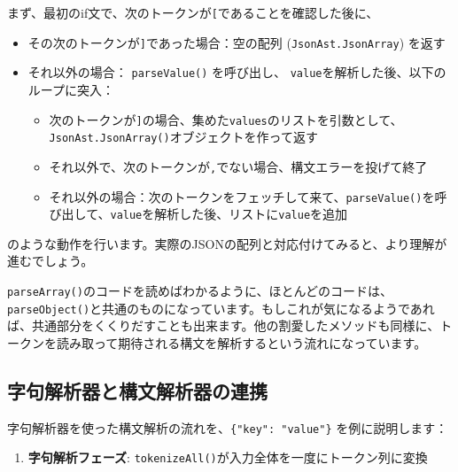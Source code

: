 まず、最初のif文で、次のトークンが\texttt{{[}}であることを確認した後に、

\begin{itemize}
\tightlist
\item
  その次のトークンが\texttt{{]}}であった場合：空の配列
  (\texttt{JsonAst.JsonArray}) を返す
\item
  それ以外の場合： \texttt{parseValue()} を呼び出し、
  \texttt{value}を解析した後、以下のループに突入：

  \begin{itemize}
  \tightlist
  \item
    次のトークンが\texttt{{]}}の場合、集めた\texttt{values}のリストを引数として、\texttt{JsonAst.JsonArray()}オブジェクトを作って返す
  \item
    それ以外で、次のトークンが\texttt{,}でない場合、構文エラーを投げて終了
  \item
    それ以外の場合：次のトークンをフェッチして来て、\texttt{parseValue()}を呼び出して、\texttt{value}を解析した後、リストに\texttt{value}を追加
  \end{itemize}
\end{itemize}

のような動作を行います。実際のJSONの配列と対応付けてみると、より理解が進むでしょう。

\texttt{parseArray()}のコードを読めばわかるように、ほとんどのコードは、\texttt{parseObject()}と共通のものになっています。もしこれが気になるようであれば、共通部分をくくりだすことも出来ます。他の割愛したメソッドも同様に、トークンを読み取って期待される構文を解析するという流れになっています。

\hypertarget{chapter3-ux5b57ux53e5ux89e3ux6790ux5668ux3068ux69cbux6587ux89e3ux6790ux5668ux306eux9023ux643a}{%
\subsection{字句解析器と構文解析器の連携}\label{chapter3-ux5b57ux53e5ux89e3ux6790ux5668ux3068ux69cbux6587ux89e3ux6790ux5668ux306eux9023ux643a}}

字句解析器を使った構文解析の流れを、\texttt{\{"key":\ "value"\}}
を例に説明します：

\begin{enumerate}
\def\labelenumi{\arabic{enumi}.}
\tightlist
\item
  \textbf{字句解析フェーズ}:
  \texttt{tokenizeAll()}が入力全体を一度にトークン列に変換
\end{enumerate}

